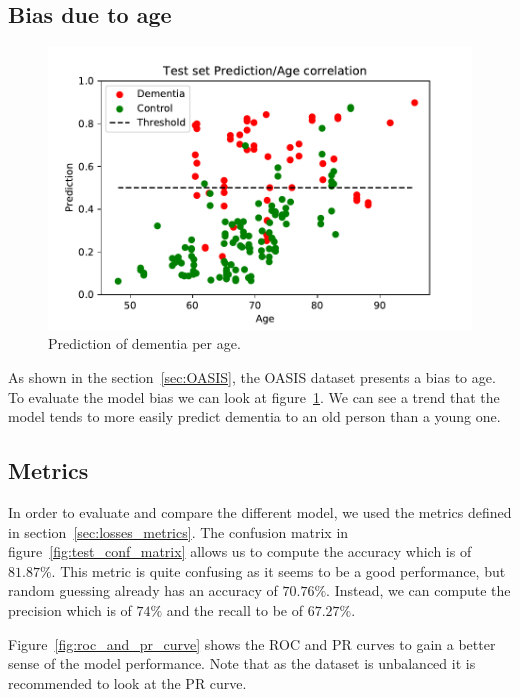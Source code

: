 \subsection{Bias due to age}
\begin{figure}
 \centering
 \includegraphics[width=.9\linewidth]{figures/Experiements/Eval/prediction_age.pdf}
 \captionsetup{width=.9\linewidth}
 \caption[PredPerAge]{Prediction of dementia per age.}
 \label{fig:prediction_per_age}
\end{figure}
As shown in the section~\ref{sec:OASIS}, the OASIS dataset presents a bias to age. To evaluate the model bias we can look at figure~\ref{fig:prediction_per_age}. We can see a trend that the model tends to more easily predict dementia to an old person than a young one.


\subsection{Metrics}
In order to evaluate and compare the different model, we used the metrics defined in section~\ref{sec:losses_metrics}. The confusion matrix in figure~\ref{fig:test_conf_matrix} allows us to compute the accuracy which is of $81.87\%$. This metric is quite confusing as it seems to be a good performance, but random guessing already has an accuracy of $70.76\%$. Instead, we can compute the precision which is of $74\%$ and the recall to be of $67.27\%$.

Figure~\ref{fig:roc_and_pr_curve} shows the ROC and PR curves to gain a better sense of the model performance. Note that as the dataset is unbalanced it is recommended to look at the PR curve. 

